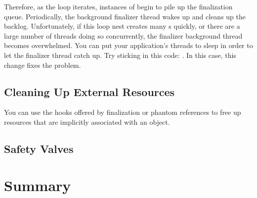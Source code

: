 Therefore, as the loop iterates, instances of  begin to pile up the
finalization queue. Periodically, the background finalizer thread wakes up and
cleans up the backlog. Unfortunately, if this loop nest creates many
s quickly, or there are a large number of threads doing so
concurrently, the finalizer background thread becomes overwhelmed. You can put
your application's threads to sleep in order to let the finalizer thread catch
up. Try sticking in this code: . In this case, this change fixes the problem.










\subsection{Cleaning Up External Resources}
\label{sec:external-resources-details}

You can use the hooks offered by finalization or phantom references to free up
resources that are implicitly associated with an object.

\subsection{Safety Valves}


\section{Summary}

\begin{table}
\centering
\begin{tabular}{cc}

\end{tabular}
\end{table}


